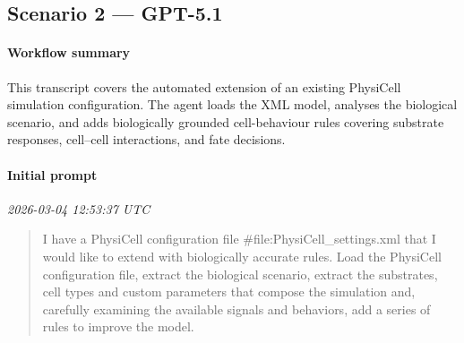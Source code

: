 \subsection{Scenario 2 — GPT-5.1}

\paragraph{Workflow summary}
This transcript covers the automated extension of an existing PhysiCell simulation configuration. The agent loads the XML model, analyses the biological scenario, and adds biologically grounded cell-behaviour rules covering substrate responses, cell–cell interactions, and fate decisions.

\paragraph{Initial prompt} \hfill \textit{\small 2026-03-04 12:53:37 UTC}
\begin{quote}
I have a PhysiCell configuration file \#file:PhysiCell\_settings.xml  that I would like to extend with biologically accurate rules. Load the PhysiCell configuration file, extract the biological scenario, extract the substrates, cell types and custom parameters that compose the simulation and, carefully examining the available signals and behaviors, add a series of rules to improve the model.
\end{quote}

